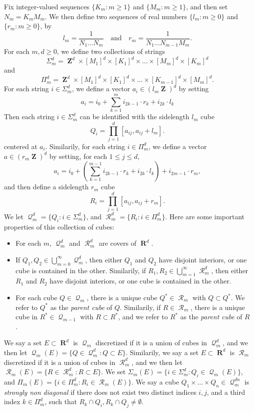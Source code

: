 \documentclass[12pt,reqno]{article}
\numberwithin{equation}{section}
\DeclareMathOperator{\RR}{\mathbf{R}}
\DeclareMathOperator{\ZZ}{\mathbf{Z}}
\DeclareMathOperator{\DQ}{\mathcal{Q}}
\DeclareMathOperator{\DR}{\mathcal{R}}
\begin{document}
Fix integer-valued sequences $\{ K_m : m \geq 1 \}$ and $\{ M_m : m \geq 1 \}$, and then set $N_m = K_m M_m$. We then define two sequences of real numbers $\{ l_m : m \geq 0 \}$ and $\{ r_m : m \geq 0 \}$, by
%
\[ l_m = \frac{1}{N_1 \dots N_m} \quad\text{and}\quad r_m = \frac{1}{N_1 \dots N_{m-1} M_m}. \]
%
For each $m, d \geq 0$, we define two collections of strings
%
\[ \Sigma_m^d = \ZZ^d \times [M_1]^d \times [K_1]^d \times \dots \times [M_m]^d \times [K_m]^d \]
%
and
%
\[ \Pi_m^d = \ZZ^d \times [M_1]^d \times [K_1]^d \times \dots \times [K_{m-1}]^d \times [M_m]^d. \]
%
For each string $i \in \Sigma_m^d$, we define a vector $a_i \in (l_m \ZZ)^d$ by setting
%
\[ a_i = i_0 + \sum_{k = 1}^m i_{2k-1} \cdot r_k + i_{2k} \cdot l_k \]
%
Then each string $i \in \Sigma_m^d$ can be identified with the sidelength $l_m$ cube
%
\[ Q_i = \prod_{j = 1}^d \left[ a_{ij}, a_{ij} + l_m \right]. \]
%
centered at $a_i$. Similarily, for each string $i \in \Pi_m^d$, we define a vector $a \in (r_m \ZZ)^d$ by setting, for each $1 \leq j \leq d$,
%
\[ a_i = i_0 + \left( \sum_{k = 1}^{m-1} i_{2k-1} \cdot r_k + i_{2k} \cdot l_k \right) + i_{2m-1} \cdot r_m, \]
%
and then define a sidelength $r_m$ cube
%
\[ R_i = \prod_{j = 1}^d \left[ a_{ij}, a_{ij} + r_m \right]. \]
%
We let $\DQ_m^d = \{ Q_i : i \in \Sigma_m^d \}$, and $\DR_m^d = \{ R_i : i \in \Pi_m^d \}$. Here are some important properties of this collection of cubes:
%
\begin{itemize}
	\item For each $m$, $\DQ_m^d$ and $\DR_m^d$ are covers of $\RR^d$.

	\item If $Q_1,Q_2 \in \bigcup_{m = 0}^\infty \DQ_m^d$, then either $Q_1$ and $Q_2$ have disjoint interiors, or one cube is contained in the other. Similarily, if $R_1,R_2 \in \bigcup_{m = 1}^\infty \DR_m^d$, then either $R_1$ and $R_2$ have disjoint interiors, or one cube is contained in the other.

	\item For each cube $Q \in \DQ_m$, there is a unique cube $Q^* \in \DR_m$ with $Q \subset Q^*$. We refer to $Q^*$ as the \emph{parent cube} of $Q$. Similarily, if $R \in \DR_m$, there is a unique cube in $R^* \in \DQ_{m-1}$ with $R \subset R^*$, and we refer to $R^*$ as the \emph{parent cube} of $R$.
\end{itemize}

We say a set $E \subset \RR^d$ is $\DQ_m$ discretized if it is a union of cubes in $\DQ_m^d$, and we then let $\DQ_m(E) = \{ Q \in \DQ_m^d : Q \subset E \}$. Similarily, we say a set $E \subset \RR^d$ is $\DR_m$ discretized if it is a union of cubes in $\DR_m^d$, and we then let $\DR_m(E) = \{ R \in \DR_m^d : R \subset E \}$. We set $\Sigma_m(E) = \{ i \in \Sigma_m^d : Q_i \in \DQ_m(E) \}$, and $\Pi_m(E) = \{ i \in \Pi_m^d : R_i \in \DR_m(E) \}$. We say a cube $Q_1 \times \dots \times Q_n \in \DQ_m^{dn}$ is \emph{strongly non diagonal} if there does not exist two distinct indices $i,j$, and a third index $k \in \Pi_m^d$, such that $R_k \cap Q_i, R_k \cap Q_j \neq \emptyset$.
\end{document}
